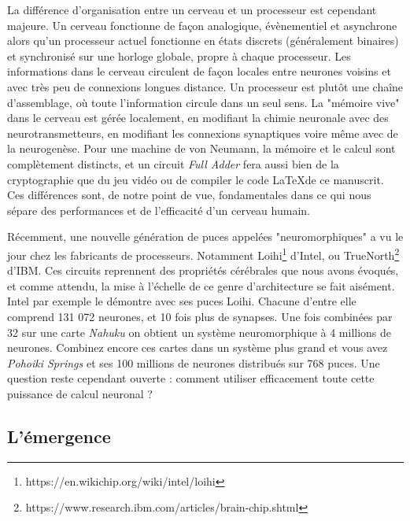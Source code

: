 	La différence d'organisation entre un cerveau et un processeur est cependant majeure. Un cerveau fonctionne de façon analogique, évènementiel et asynchrone alors qu'un processeur actuel fonctionne en états discrets (généralement binaires) et synchronisé sur une horloge globale, propre à chaque processeur. Les informations dans le cerveau circulent de façon locales entre neurones voisins et avec très peu de connexions longues distance. Un processeur est plutôt une chaîne d'assemblage, où toute l'information circule dans un seul sens. La "mémoire vive" dans le cerveau est gérée localement, en modifiant la chimie neuronale avec des neurotransmetteurs, en modifiant les connexions synaptiques voire même avec de la neurogenèse. Pour une machine de von Neumann, la mémoire et le calcul sont complètement distincts, et un circuit \textit{Full Adder} fera aussi bien de la cryptographie que du jeu vidéo ou de compiler le code \LaTeX de ce manuscrit. Ces différences sont, de notre point de vue, fondamentales dans ce qui nous sépare des performances et de l'efficacité d'un cerveau humain.

	Récemment, une nouvelle génération de puces appelées "neuromorphiques" a vu le jour chez les fabricants de processeurs. Notamment Loihi\footnote{https://en.wikichip.org/wiki/intel/loihi} d'Intel, ou TrueNorth\footnote{https://www.research.ibm.com/articles/brain-chip.shtml} d'IBM. Ces circuits reprennent des propriétés cérébrales que nous avons évoqués, et comme attendu, la mise à l'échelle de ce genre d'architecture se fait aisément. Intel par exemple le démontre avec ses puces Loihi. Chacune d'entre elle comprend 131 072 neurones, et 10 fois plus de synapses. Une fois combinées par 32 sur une carte \textit{Nahuku} on obtient un système neuromorphique à 4 millions de neurones. Combinez encore ces cartes dans un système plus grand et vous avez \textit{Pohoiki Springs} et ses 100 millions de neurones distribués sur 768 puces. Une question reste cependant ouverte : comment utiliser efficacement toute cette puissance de calcul neuronal ?

\subsection{L'émergence}

